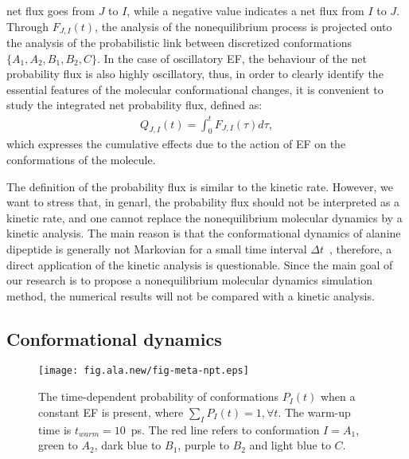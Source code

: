\documentclass[a4paper,preprint,unsortedaddress,onecolumn]{revtex4-1}
\newcommand{\recheck}[1]{{\color{red} #1}}
\begin{document}
net flux goes from $J$ to $I$,
while a negative value indicates a net flux from $I$ to $J$.
Through $F_{J,I}(t)$, the analysis of the nonequilibrium process 
is projected onto the analysis of the probabilistic link between discretized conformations $\{A_1, A_2, B_1, B_2, C\}$.
In the case of oscillatory EF, the behaviour of the net probability flux is also highly oscillatory, thus, in order to clearly identify the essential features of the molecular conformational changes, it is convenient to study the integrated net probability flux, defined as:
\begin{align}\label{eqn:tmp7a}
  Q_{J,I} (t) = \int_0^t F_{J,I}(\tau)d \tau,
\end{align}
which expresses the cumulative effects due to the action of EF on the conformations of the molecule.

\recheck{ The definition of the probability flux is similar to the
  kinetic rate.  However, we want to stress that, in genarl, the
  probability flux should not be interpreted as a kinetic rate, and
  one cannot replace the nonequilibrium molecular dynamics by a
  kinetic analysis. The main reason is that the conformational
  dynamics of alanine dipeptide is generally not Markovian for a small
  time interval $\Delta t$~\cite{prinz2011markov}, therefore, a direct application of the kinetic
  analysis is questionable. Since the main goal of our research is to propose a
  nonequilibrium molecular dynamics simulation method, the numerical
  results will not be compared with a kinetic analysis.
}

\subsection{Conformational dynamics}


\begin{figure}
  \centering
  \texttt{[image: fig.ala.new/fig-meta-npt.eps]}
  \caption{The time-dependent probability of conformations $P_I(t)$ 
    when a constant EF is present, where $\sum_I P_I(t) = 1, \forall t$.
    The warm-up time is $t_{warm} = 10$~ps. The red line refers to conformation $I = A_1$,
    green to $A_2$, dark blue to $B_1$, purple to $B_2$ and light blue
    to $C$. 
  }
  \label{fig:tmp5}
\end{figure}
\end{document}
